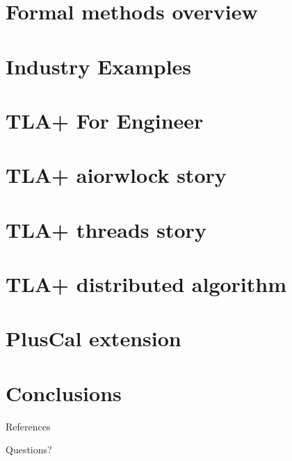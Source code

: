 \documentclass[12pt]{beamer}
\begin{document}
  \section{Formal methods overview}
  \section{Industry Examples}
  \section{TLA+ For Engineer}
  \section{TLA+ aiorwlock story}
  \section{TLA+ threads story}
  \section{TLA+ distributed algorithm}
  \section{PlusCal extension}
  \section{Conclusions}
\appendix
\begin{frame}[shrink=30]{References}
    
    
\end{frame}
\begin{frame}[standout]
  Questions?
\end{frame}
\end{document}

